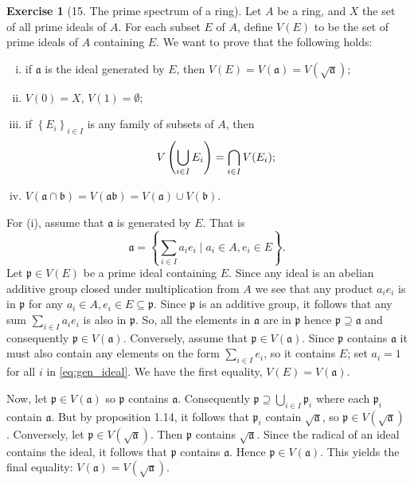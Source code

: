 \documentclass{article}
\theoremstyle{definition}
\newtheorem*{exercise}{Exercise}
\begin{document}
\begin{exercise}[15. The prime spectrum of a ring]
    Let $A$ be a ring, and $X$ the set of all prime ideals of $A$. For
    each subset $E$ of $A$, define $V(E)$ to be the set of prime
    ideals of $A$ containing $E$. We want to prove that the following holds:
    \begin{enumerate}[(i)]
        \item if $\mathfrak{a}$ is the ideal generated by $E$,
            then $V(E) = V(\mathfrak{a}) =
            V(\sqrt{\mathfrak{a}})$;
        \item $V(0) = X$, $V(1) = \emptyset$;
        \item if $\left\{ E_i \right\}_{i \in I}$ is any family of
            subsets of $A$, then
            \begin{equation}
                \notag
                V\left(\bigcup_{i \in I} E_i\right) =
                \bigcap_{i \in I} V(E_i);
            \end{equation}
        \item $V(\mathfrak{a} \cap \mathfrak{b}) =
            V(\mathfrak{a}\mathfrak{b}) = V(\mathfrak{a})\cup
            V(\mathfrak{b})$.
    \end{enumerate}
    For (i), assume that $\mathfrak{a}$ is generated by $E$. That is
    \begin{equation}
        \label{eq:gen_ideal}
        \tag{*}
        \mathfrak{a} = \left\{ \sum_{i\in I} a_ie_i \mid a_i \in A, e_i \in E \right\}.
    \end{equation}
    Let $\mathfrak{p} \in V(E)$ be a prime ideal containing $E$. Since
    any ideal is an abelian additive group closed under multiplication
    from $A$ we see that any product $a_ie_i$ is in $\mathfrak{p}$ for
    any $a_i \in A, e_i \in E \subseteq \mathfrak{p}$. Since
    $\mathfrak{p}$ is an additive group, it follows that any sum $
    \sum^{}_{i \in I} a_i e_i$ is also in $\mathfrak{p}$. So, all the
    elements in $\mathfrak{a}$ are in $\mathfrak{p}$ hence
    $\mathfrak{p} \supseteq \mathfrak{a}$ and consequently
    $\mathfrak{p} \in V(\mathfrak{a})$. Conversely, assume that
    $\mathfrak{p} \in V(\mathfrak{a})$. Since $\mathfrak{p}$ contains
    $\mathfrak{a}$ it must also contain any elements on the form
    $\sum^{}_{i \in I} e_i$, so it contains $E$; set $a_i = 1$ for all
    $i$ in \cref{eq:gen_ideal}. We have the first equality, $V(E) =
    V(\mathfrak{a})$.

    Now, let $\mathfrak{p} \in V(\mathfrak{a})$ so $\mathfrak{p}$
    contains $\mathfrak{a}$. Consequently $\mathfrak{p} \supseteq
    \bigcup_{i \in I}\mathfrak{p}_i$ where each $\mathfrak{p}_i$
    contain $\mathfrak{a}$. But by proposition 1.14, it follows that
    $\mathfrak{p}_i$ contain $\sqrt{\mathfrak{a}}$, so $\mathfrak{p}
    \in V(\sqrt{\mathfrak{a}})$. Conversely, let $\mathfrak{p} \in
    V(\sqrt{\mathfrak{a}})$. Then $\mathfrak{p}$ contains
    $\sqrt{\mathfrak{a}}$. Since the radical of an ideal contains the
    ideal, it follows that $\mathfrak{p}$ contains $\mathfrak{a}$.
    Hence $\mathfrak{p} \in V(\mathfrak{a})$. This yields the final
    equality: $V(\mathfrak{a}) = V(\sqrt{\mathfrak{a}})$.


\end{exercise}
\end{document}
